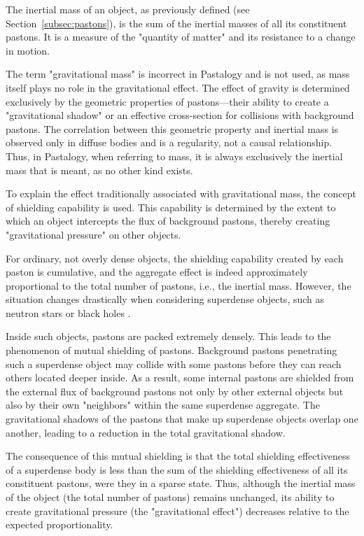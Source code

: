 \documentclass[pdflatex,sn-mathphys-num]{sn-jnl}
\begin{document}
The inertial mass of an object, as previously defined (see Section~\ref{subsec:pastons}), is the sum of the inertial masses of all its constituent pastons. It is a measure of the "quantity of matter" and its resistance to a change in motion.

The term "gravitational mass" is incorrect in Pastalogy and is not used, as mass itself plays no role in the gravitational effect. The effect of gravity is determined exclusively by the geometric properties of pastons---their ability to create a "gravitational shadow" or an effective cross-section for collisions with background pastons. The correlation between this geometric property and inertial mass is observed only in diffuse bodies and is a regularity, not a causal relationship. Thus, in Pastalogy, when referring to mass, it is always exclusively the inertial mass that is meant, as no other kind exists.

To explain the effect traditionally associated with gravitational mass, the concept of shielding capability is used. This capability is determined by the extent to which an object intercepts the flux of background pastons, thereby creating "gravitational pressure" on other objects.

For ordinary, not overly dense objects, the shielding capability created by each paston is cumulative, and the aggregate effect is indeed approximately proportional to the total number of pastons, i.e., the inertial mass. However, the situation changes drastically when considering superdense objects, such as neutron stars or black holes \cite{shapiro-teukolsky1983}.

Inside such objects, pastons are packed extremely densely. This leads to the phenomenon of mutual shielding of pastons. Background pastons penetrating such a superdense object may collide with some pastons before they can reach others located deeper inside. As a result, some internal pastons are shielded from the external flux of background pastons not only by other external objects but also by their own "neighbors" within the same superdense aggregate. The gravitational shadows of the pastons that make up superdense objects overlap one another, leading to a reduction in the total gravitational shadow.

The consequence of this mutual shielding is that the total shielding effectiveness of a superdense body is less than the sum of the shielding effectiveness of all its constituent pastons, were they in a sparse state. Thus, although the inertial mass of the object (the total number of pastons) remains unchanged, its ability to create gravitational pressure (the "gravitational effect") decreases relative to the expected proportionality.
\end{document}
